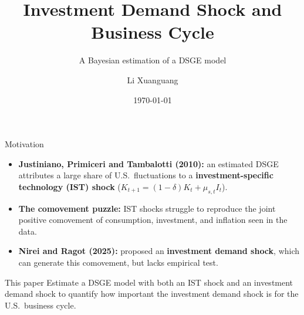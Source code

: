 \documentclass[9pt]{beamer}
\title{Investment Demand Shock and Business Cycle}
\subtitle{A Bayesian estimation of a DSGE model}
\author{Li Xuanguang}
\date{\today}
\begin{document}
\begin{frame}
	\titlepage
	\vspace{-1em}
\end{frame}

\begin{frame}{Motivation}
	\begin{itemize}
		\item \textbf{Justiniano, Primiceri and Tambalotti (2010):} an estimated DSGE attributes a large share of U.S.\ fluctuations to a \textbf{investment-specific technology (IST) shock} ($K_{t+1}=(1-\delta)K_t+\mu_{s,t}I_t$).
		\item \textbf{The comovement puzzle:} IST shocks struggle to reproduce the joint positive comovement of consumption, investment, and inflation seen in the data.
		\item \textbf{Nirei and Ragot (2025):} proposed an \textbf{investment demand shock}, which can generate this comovement, but lacks empirical test.
	\end{itemize}
	\vspace{0.5em}
	\begin{block}{This paper}
		Estimate a DSGE model with both an IST shock and an investment demand shock to quantify how important the investment demand shock is for the U.S.\ business cycle.
	\end{block}
\end{frame}
\end{document}
